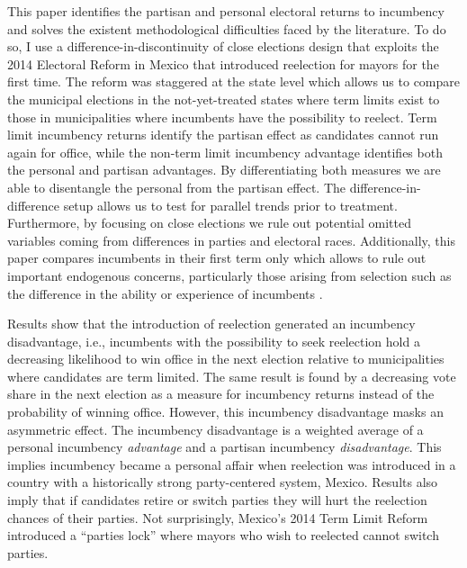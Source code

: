 \documentclass[12pt]{amsart}
\numberwithin{equation}{section}
\theoremstyle{definition}
\theoremstyle{definition}
\theoremstyle{definition}
\begin{document}
This paper identifies the partisan and personal electoral returns to incumbency and solves the existent methodological difficulties faced by the literature. To do so, I use a difference-in-discontinuity of close elections design that exploits the 2014 Electoral Reform in Mexico that introduced reelection for mayors for the first time. The reform was staggered at the state level which allows us to compare the municipal elections in the not-yet-treated states where term limits exist to those in municipalities where incumbents have the possibility to reelect. Term limit incumbency returns identify the partisan effect as candidates cannot run again for office, while the non-term limit incumbency advantage identifies both the personal and partisan advantages. By differentiating both measures we are able to disentangle the personal from the partisan effect. The difference-in-difference setup allows us to test for parallel trends prior to treatment. Furthermore, by focusing on close elections we rule out potential omitted variables coming from differences in parties and electoral races. Additionally, this paper compares incumbents in their first term only which allows to rule out important endogenous concerns, particularly those arising from selection such as the difference in the ability or experience of incumbents \citep{ferraz_finan_2008, ferraz_finan_2011}. %
 

Results show that the introduction of reelection generated an incumbency disadvantage, i.e., incumbents with the possibility to seek reelection hold a decreasing likelihood to win office in the next election relative to municipalities where candidates are term limited. The same result is found by a decreasing vote share in the next election as a measure for incumbency returns instead of the probability of winning office. However, this incumbency disadvantage masks an asymmetric effect. The incumbency disadvantage is a weighted average of a personal incumbency \emph{advantage} and a partisan incumbency \emph{disadvantage}. This implies incumbency became a personal affair when reelection was introduced in a country with a historically strong party-centered system, Mexico. Results also imply that if candidates retire or switch parties they will hurt the reelection chances of their parties. Not surprisingly, Mexico's 2014 Term Limit Reform introduced a ``parties lock'' where mayors who wish to reelected cannot switch parties.  
\end{document}
